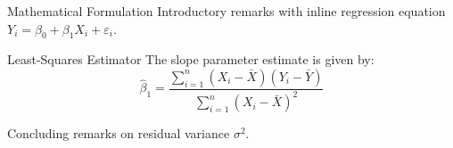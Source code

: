 \documentclass[14pt,t]{beamer}
\begin{document}
\begin{frame}{Mathematical Formulation}
Introductory remarks with inline regression equation $Y_i = \beta_0 + \beta_1 X_i + \varepsilon_i$.

\begin{block}{Least-Squares Estimator}
The slope parameter estimate is given by:
\[
\hat{\beta}_1 = \frac{\sum_{i=1}^n (X_i - \bar{X})(Y_i - \bar{Y})}{\sum_{i=1}^n (X_i - \bar{X})^2}
\]
\end{block}

Concluding remarks on residual variance $\sigma^2$.
\end{frame}
\end{document}
